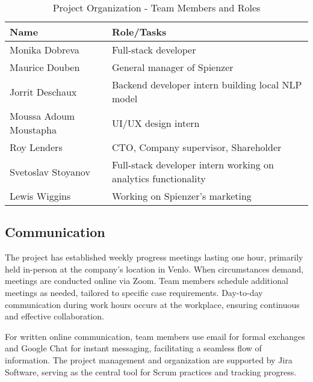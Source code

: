\documentclass[12pt,a4paper]{article}
\begin{document}
\begin{table}[h!]
\centering
\begin{tabular}{|l|l|}
\hline
\textbf{Name} & \textbf{Role/Tasks} \\
\hline
Monika Dobreva & Full-stack developer \\
\hline
Maurice Douben & General manager of Spienzer \\
\hline
Jorrit Deschaux & Backend developer intern building local NLP model \\
\hline
Moussa Adoum Moustapha & UI/UX design intern \\
\hline
Roy Lenders & CTO, Company supervisor, Shareholder \\
\hline
Svetoslav Stoyanov & Full-stack developer intern working on analytics functionality \\
\hline
Lewis Wiggins & Working on Spienzer’s marketing \\
\hline
\end{tabular}
\caption{Project Organization - Team Members and Roles}
\end{table}

\subsection{Communication}
The project has established weekly progress meetings lasting one hour, primarily held in-person at the company's location in Venlo. When circumstances demand, meetings are conducted online via Zoom. Team members schedule additional meetings as needed, tailored to specific case requirements. Day-to-day communication during work hours occurs at the workplace, ensuring continuous and effective collaboration. \vspace{1em} %

For written online communication, team members use email for formal exchanges and Google Chat for instant messaging, facilitating a seamless flow of information. The project management and organization are supported by Jira Software, serving as the central tool for Scrum practices and tracking progress.

\newpage
\end{document}
